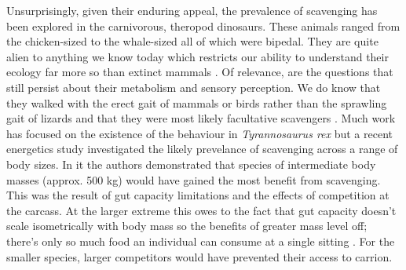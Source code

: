 \documentclass[a4paper,12pt]{article}
\begin{document}
Unsurprisingly, given their enduring appeal, the prevalence of scavenging has been explored in the carnivorous, theropod dinosaurs. These animals ranged from the chicken-sized to the whale-sized all of which were bipedal. They are quite alien to anything we know today which restricts our ability to understand their ecology far more so than extinct mammals \citep{weishampel2004dinosauria}. Of relevance, are the questions that still persist about their metabolism \citep{grady2014evidence} and sensory perception. We do know that they walked with the erect gait of mammals or birds rather than the sprawling gait of lizards and that they were most likely facultative scavengers \citep{depalma2013physical}. Much work has focused on the existence of the behaviour in \textit{Tyrannosaurus rex} \citep{ruxton2003could,carbone2011intra} but a recent energetics study investigated the likely prevelance of scavenging across a range of body sizes. In it the authors demonstrated that species of intermediate body masses (approx. 500 kg) would have gained the most benefit from scavenging. This was the result of gut capacity limitations and the effects of competition at the carcass. At the larger extreme this owes to the fact that gut capacity doesn't scale isometrically with body mass so the benefits of greater mass level off; there's only so much food an individual can consume at a single sitting \citep{calder1996size}. For the smaller species, larger competitors would have prevented their access to carrion. 
\end{document}
